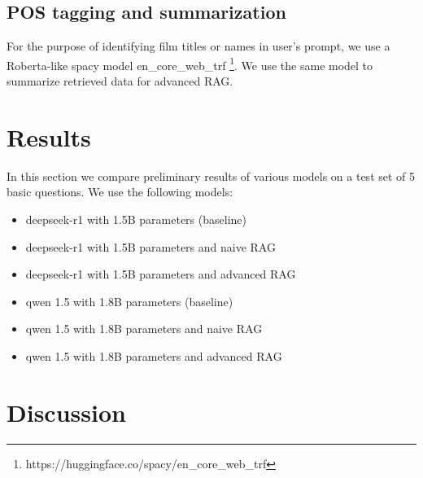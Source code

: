 \documentclass[fleqn,moreauthors,10pt]{ds_report}
\begin{document}
\subsection*{POS tagging and summarization}

For the purpose of identifying film titles or names in user's prompt, we use a Roberta-like spacy model en\_core\_web\_trf \footnote{https://huggingface.co/spacy/en\_core\_web\_trf}. We use the same model to summarize retrieved data for advanced RAG.  



\section*{Results}

In this section we compare preliminary results of various models on a test set of 5 basic questions. We use the following models:
\begin{itemize}
	\item deepseek-r1 with 1.5B parameters (baseline)
	\item deepseek-r1 with 1.5B parameters and naive RAG
	\item deepseek-r1 with 1.5B parameters and advanced RAG
	\item qwen 1.5 with 1.8B parameters (baseline)
	\item qwen 1.5 with 1.8B parameters and naive RAG
	\item qwen 1.5 with 1.8B parameters and advanced RAG
\end{itemize}




\section*{Discussion}





\end{document}
